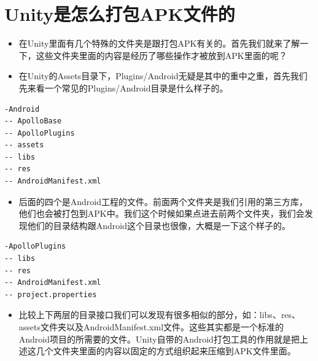 \documentclass[9pt, b5paper]{article}
\begin{document}
\section{Unity是怎么打包APK文件的}
\label{sec-4}
\begin{itemize}
\item 在Unity里面有几个特殊的文件夹是跟打包APK有关的。首先我们就来了解一下，这些文件夹里面的内容是经历了哪些操作才被放到APK里面的呢？
\item 在Unity的Assets目录下，Plugins/Android无疑是其中的重中之重，首先我们先来看一个常见的Plugins/Android目录是什么样子的。
\end{itemize}
\begin{verbatim}
-Android
-- ApolloBase
-- ApolloPlugins
-- assets
-- libs
-- res
-- AndroidManifest.xml
\end{verbatim}
\begin{itemize}
\item 后面的四个是Android工程的文件。前面两个文件夹是我们引用的第三方库，他们也会被打包到APK中。我们这个时候如果点进去前两个文件夹，我们会发现他们的目录结构跟Android这个目录也很像，大概是一下这个样子的。
\end{itemize}
\begin{verbatim}
-ApolloPlugins
-- libs
-- res
-- AndroidManifest.xml
-- project.properties
\end{verbatim}
\begin{itemize}
\item 比较上下两层的目录接口我们可以发现有很多相似的部分，如：libs、res、assets文件夹以及AndroidManifest.xml文件。这些其实都是一个标准的Android项目的所需要的文件。Unity自带的Android打包工具的作用就是把上述这几个文件夹里面的内容以固定的方式组织起来压缩到APK文件里面。
\end{itemize}
\end{document}
